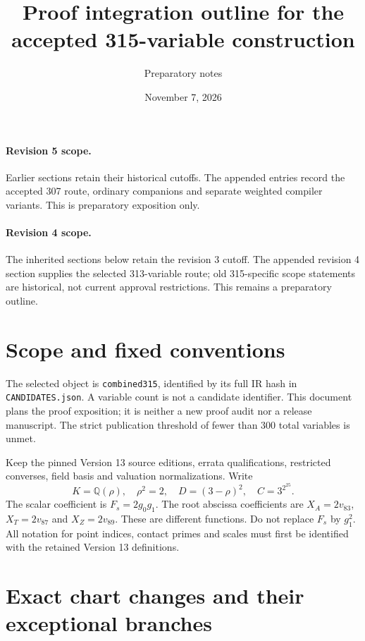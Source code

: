 \documentclass{article}
\begin{document}
\paragraph{Revision 5 scope.} Earlier sections retain their historical cutoffs. The appended entries record the accepted 307 route, ordinary companions and separate weighted compiler variants. This is preparatory exposition only.

\paragraph{Revision 4 scope.} The inherited sections below retain the revision 3 cutoff. The appended revision 4 section supplies the selected 313-variable route; old 315-specific scope statements are historical, not current approval restrictions. This remains a preparatory outline.

\title{Proof integration outline for the accepted 315-variable construction}
\author{Preparatory notes}
\date{November 7, 2026}
\maketitle

\section{Scope and fixed conventions}\label{outline:scope}
The selected object is \texttt{combined315}, identified by its full IR hash
in \texttt{CANDIDATES.json}. A variable count is not a candidate identifier.
This document plans the proof exposition; it is neither a new proof audit
nor a release manuscript. The strict publication threshold of fewer than
300 total variables is unmet.

Keep the pinned Version 13 source editions, errata qualifications, restricted
converses, field basis and valuation normalizations. Write
\[
 K=\mathbb Q(\rho),\quad \rho^2=2,\quad D=(3-\rho)^2,
 \quad C=3^{2^{25}}.
\]
The scalar coefficient is $F_s=2g_0g_1$. The root abscissa coefficients
are $X_A=2v_{83}$, $X_T=2v_{87}$ and $X_Z=2v_{89}$.
These are different functions. Do not replace $F_s$ by $g_1^2$.
All notation for point indices, contact primes and scales must first be
identified with the retained Version 13 definitions.

\section{Exact chart changes and their exceptional branches}
\label{outline:charts}
\end{document}

